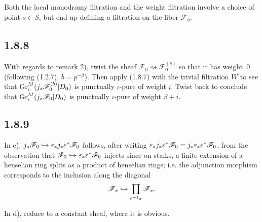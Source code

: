 \documentclass[deligne.tex]{subfiles}
\begin{document}
\begin{remark}
	Both the local monodromy filtration and the weight
	filtration involve a choice of point $s\in S$, but end up defining a
	filtration on the fiber $\mathscr F_{\overline\eta}$.
\end{remark}


\subsection*{1.8.8} With regards to remark 2), twist the sheaf
$\mathscr F_0\rightsquigarrow\mathscr F_0^{(b)}$ so that it has
weight~0 (following (1.2.7), $b=p^{-\beta}$).
Then apply (1.8.7) with the trivial filtration $W$ to see that
$\operatorname{Gr}_i^M(j_\ast\mathscr F_0^{(b)}|D_0)$ is
punctually $\iota$-pure of weight $i$.
Twist back to conclude that $\operatorname{Gr}_i^M(j_\ast\mathscr F_0|D_0)$ is punctually
$\iota$-pure of weight $\beta+i$.

\subsection*{1.8.9} In c),
$j_\ast\mathscr F_0\hookrightarrow\varepsilon_\ast j_\ast \varepsilon^\ast\mathscr F_0$
follows, after writing
$\varepsilon_\ast j_\ast\varepsilon^\ast\mathscr F_0=j_\ast\varepsilon_\ast\varepsilon^\ast\mathscr F_0$,
from the observation that
$\mathscr F_0\hookrightarrow \varepsilon_\ast\varepsilon^\ast\mathscr F_0$
injects since on stalks, a finite extension of a henselian ring splits
as a product of henselian rings; i.e. the adjunction morphism corresponds
to the inclusion along the diagonal
\begin{equation*}
	\mathscr F_x\hookrightarrow\prod_{\varepsilon^{-1}x}\mathscr F_x.
\end{equation*}

In d), reduce to a constant sheaf, where it is obvious.
\end{document}

